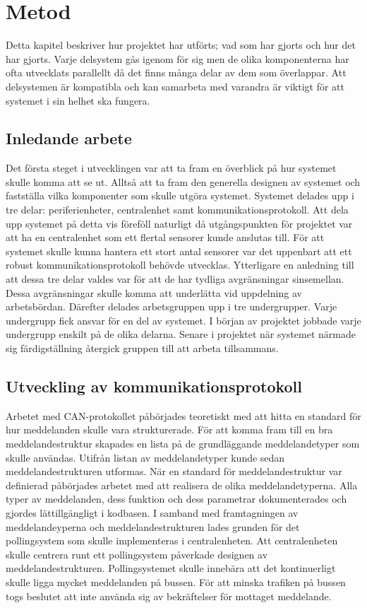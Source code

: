 \documentclass[a4paper]{article}
\newcommand{\todo}[1]{\marginpar{TODO: #1}\vspace{1cm}}
\begin{document}
\newpage

\todo{Varför vi har gjort som vi har gjort}
\section{Metod}
Detta kapitel beskriver hur projektet har utförts; vad som har gjorts och hur det har gjorts.
Varje delsystem gås igenom för sig men de olika komponenterna har ofta utvecklats parallellt då det finns många delar av dem som överlappar.
Att delsystemen är kompatibla och kan samarbeta med varandra är viktigt för att systemet i sin helhet ska fungera.

\subsection{Inledande arbete}

Det första steget i utvecklingen var att ta fram en överblick på hur systemet skulle komma att se ut.
Alltså att ta fram den generella designen av systemet och fastställa vilka komponenter som skulle utgöra systemet.
Systemet delades upp i tre delar:
periferienheter, centralenhet samt kommunikationsprotokoll.
Att dela upp systemet på detta vis föreföll naturligt då utgångspunkten för projektet var att ha en centralenhet som ett flertal sensorer kunde anslutas till.
För att systemet skulle kunna hantera ett stort antal sensorer var det uppenbart att ett robust kommunikationsprotokoll behövde utvecklas.
Ytterligare en anledning till att dessa tre delar valdes var för att de har tydliga avgränsningar sinsemellan.
Dessa avgränsningar skulle komma att underlätta vid uppdelning av arbetsbördan.
Därefter delades arbetsgruppen upp i tre undergrupper.
Varje undergrupp fick ansvar för en del av systemet.
I början av projektet jobbade varje undergrupp enskilt på de olika delarna.
Senare i projektet när systemet närmade sig färdigställning återgick gruppen till att arbeta tillsammans.

\subsection{Utveckling av kommunikationsprotokoll}
Arbetet med CAN-protokollet påbörjades teoretiskt med att hitta en standard för hur meddelanden skulle vara strukturerade.
För att komma fram till en bra meddelandestruktur skapades en lista på de grundläggande meddelandetyper som skulle användas.
Utifrån listan av meddelandetyper kunde sedan meddelandestrukturen utformas.
När en standard för meddelandestruktur var definierad påbörjades arbetet med att realisera de olika meddelandetyperna.
Alla typer av meddelanden, dess funktion och dess parametrar dokumenterades och gjordes lättillgängligt i kodbasen.
I samband med framtagningen av meddelandeyperna och meddelandestrukturen lades grunden för det pollingsystem som skulle implementeras i centralenheten.
Att centralenheten skulle centrera runt ett pollingsystem påverkade designen av meddelandestrukturen.
Pollingsystemet skulle innebära att det kontinuerligt skulle ligga mycket meddelanden på bussen.
För att minska trafiken på bussen togs beslutet att inte använda sig av bekräftelser för mottaget meddelande.
\end{document}
